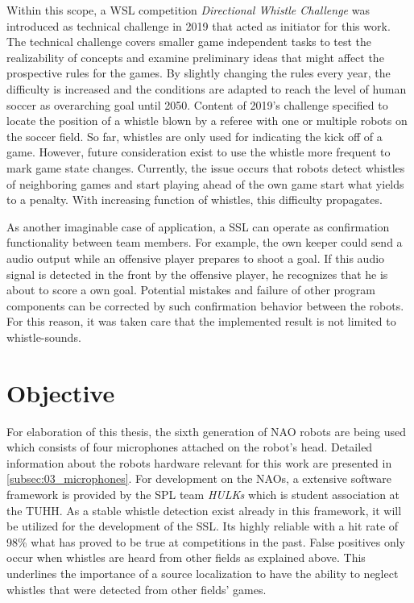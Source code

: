 Within this scope, a \acf{WSL} competition \textit{Directional Whistle Challenge} was
introduced as technical challenge in 2019 that acted as initiator for this work.
The technical challenge covers smaller game independent tasks to test the realizability of
concepts and examine preliminary ideas that might affect the prospective rules for the games.
By slightly changing the rules every year, the difficulty is increased and the conditions
are adapted to reach the level of human soccer as overarching goal until 2050.
Content of 2019's challenge specified to locate the position of a whistle blown by a referee
with one or multiple robots on the soccer field.
So far, whistles are only used for indicating the kick off of a game.
However, future consideration exist to use the whistle more frequent
to mark game state changes.
Currently, the issue occurs that robots detect whistles of neighboring
games and start playing ahead of the own game start what yields to a penalty.
With increasing function of whistles, this difficulty propagates.

As another imaginable case of application, a \ac{SSL} can operate as confirmation
functionality between team members.
For example, the own keeper could send a audio output while an offensive player prepares
to shoot a goal.
If this audio signal is detected in the front by the offensive player, he recognizes
that he is about to score a own goal.
Potential mistakes and failure of other program components can be corrected by such
confirmation behavior between the robots.
For this reason, it was taken care that the implemented result is not limited to
whistle-sounds.

\section{Objective}
\label{sec:01_objective}

For elaboration of this thesis, the sixth generation of NAO robots are being used
which consists of four microphones attached on the robot's head.
Detailed information about the robots hardware relevant for this work are presented
in \cref{subsec:03_microphones}.
For development on the NAOs, a extensive software framework is provided by the
\ac{SPL} team \textit{HULKs} which is student association at the \ac{TUHH}.
As a stable whistle detection exist already in this framework,
it will be utilized for the development of the \ac{SSL}.
Its highly reliable with a hit rate of 98\si{\percent} \cite{Hasselbring} what has proved to be true at
competitions in the past.
False positives only occur when whistles are heard from other fields as explained above.
This underlines the importance of a source localization to have the ability to neglect whistles
that were detected from other fields' games.

